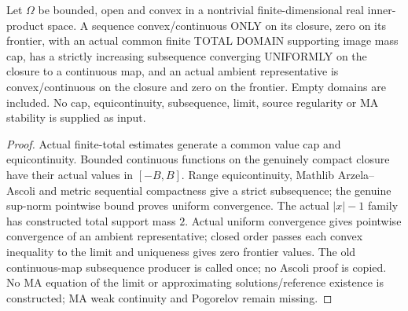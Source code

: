 \begin{lemma}
  \label{lem:domain-dirichlet-subsequence}
  \leanok
  Let $\Omega$ be bounded, open and convex in a nontrivial finite-dimensional
  real inner-product space. A sequence convex/continuous ONLY on its closure,
  zero on its frontier, with an actual common finite TOTAL DOMAIN supporting
  image mass cap, has a strictly increasing subsequence converging UNIFORMLY
  on the closure to a continuous map, and an actual ambient representative is
  convex/continuous on the closure and zero on the frontier. Empty domains are included.
  No cap, equicontinuity, subsequence, limit, source regularity or MA stability
  is supplied as input.
\end{lemma}
\begin{proof}
  \leanok
  Actual finite-total estimates generate a common value cap and equicontinuity.
  Bounded continuous functions on the genuinely compact closure have their
  actual values in $[-B,B]$. Range equicontinuity, Mathlib Arzela--Ascoli and
  metric sequential compactness give a strict subsequence; the genuine
  sup-norm pointwise bound proves uniform convergence. The actual $|x|-1$
  family has constructed total support mass $2$. Actual uniform convergence
  gives pointwise convergence of an ambient representative; closed order passes
  each convex inequality to the limit and uniqueness gives zero frontier values.
  The old continuous-map subsequence producer is called once; no Ascoli proof
  is copied. No MA equation of the limit or approximating solutions/reference
  existence is constructed; MA weak continuity and Pogorelov remain missing.
\end{proof}

